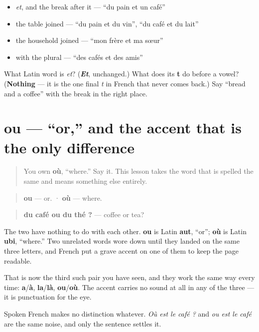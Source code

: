\begin{itemize}
\raggedright
  \item \emph{et}, and the break after it — \textquotedblleft{}du pain et un café\textquotedblright{}
  \item the table joined — \textquotedblleft{}du pain et du vin\textquotedblright{}, \textquotedblleft{}du café et du lait\textquotedblright{}
  \item the household joined — \textquotedblleft{}mon frère et ma sœur\textquotedblright{}
  \item with the plural — \textquotedblleft{}des cafés et des amis\textquotedblright{}
\end{itemize}

\begin{tcolorbox}[breakable,colback=teal!4,colframe=teal!35!black,title={Before you move on}]
What Latin word is \emph{et}? (\emph{\textbf{Et}}, unchanged.) What does its \textbf{t} do before a vowel? (\textbf{Nothing} — it is the one final \emph{t} in French that never comes back.) Say \textquotedblleft{}bread and a coffee\textquotedblright{} with the break in the right place.
\end{tcolorbox}
\section[ou]{ou — \textquotedblleft{}or,\textquotedblright{} and the accent that is the only difference}

\label{lesson:FR-C36-ou-conj}



\begin{quote}
You own \textbf{où}, \textquotedblleft{}where.\textquotedblright{} Say it. This lesson takes the word that is spelled the same and means something else entirely.
\end{quote}

\begin{cousinweb}
\begin{quote}
\textbf{ou} — or. · \textbf{où} — where.
\end{quote}

\begin{quote}
\textbf{du café ou du thé ?} — coffee or tea?
\end{quote}

The two have nothing to do with each other. \textbf{ou} is Latin \textbf{aut}, \textquotedblleft{}or\textquotedblright{}; \textbf{où} is Latin \textbf{ubi}, \textquotedblleft{}where.\textquotedblright{} Two unrelated words wore down until they landed on the same three letters, and French put a grave accent on one of them to keep the page readable.

That is now the third such pair you have seen, and they work the same way every time: \textbf{a}/\textbf{à}, \textbf{la}/\textbf{là}, \textbf{ou}/\textbf{où}. The accent carries no sound at all in any of the three — it is punctuation for the eye.

Spoken French makes no distinction whatever. \emph{Où est le café ?} and \emph{ou est le café} are the same noise, and only the sentence settles it.
\end{cousinweb}

